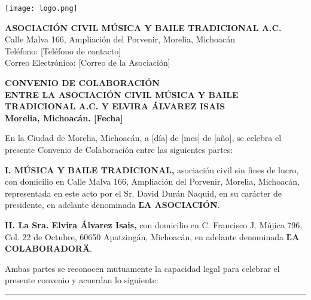 \documentclass[a4paper,12pt]{article}
\begin{document}
\begin{flushleft}
    \texttt{[image: logo.png]} %
    \hfill
    \begin{minipage}[t]{0.8\textwidth}
        \textbf{\large ASOCIACIÓN CIVIL MÚSICA Y BAILE TRADICIONAL A.C.} \\
        Calle Malva 166, Ampliación del Porvenir, Morelia, Michoacán \\
        Teléfono: [Teléfono de contacto] \\
        Correo Electrónico: [Correo de la Asociación]
    \end{minipage}
\end{flushleft}

\vspace{1cm}

\begin{center}
    \textbf{\Large CONVENIO DE COLABORACIÓN} \\[0.5cm]
    \textbf{\large ENTRE LA ASOCIACIÓN CIVIL MÚSICA Y BAILE TRADICIONAL A.C. Y ELVIRA ÁLVAREZ ISAIS} \\[0.5cm]
    \textbf{Morelia, Michoacán. [Fecha]}
\end{center}

\vspace{1cm}

En la Ciudad de Morelia, Michoacán, a [día] de [mes] de [año], se celebra el presente Convenio de Colaboración entre las siguientes partes:

\noindent
\textbf{I. MÚSICA Y BAILE TRADICIONAL,} asociación civil sin fines de lucro, con domicilio en Calle Malva 166, Ampliación del Porvenir, Morelia, Michoacán, representada en este acto por el Sr. David Durán Naquid, en su carácter de presidente, en adelante denominada \textbf{\"LA ASOCIACIÓN\"}.

\noindent
\textbf{II. La Sra. Elvira Álvarez Isais,} con domicilio en C. Francisco J. Mújica 796, Col. 22 de Octubre, 60650 Apatzingán, Michoacán, en adelante denominada \textbf{\"LA COLABORADORA\"}.

\vspace{0.5cm}

Ambas partes se reconocen mutuamente la capacidad legal para celebrar el presente convenio y acuerdan lo siguiente:

\vspace{0.5cm}

\hrule

\vspace{0.5cm}
\end{document}
